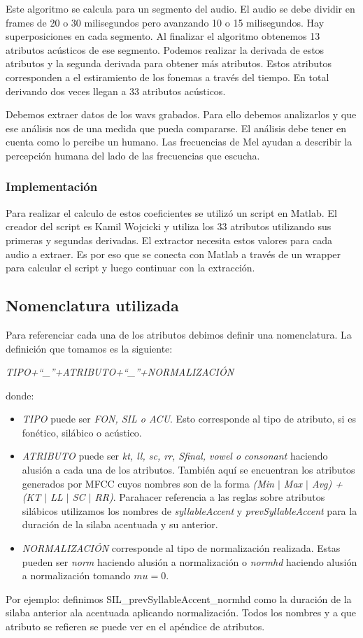 Este algoritmo se calcula para un segmento del audio. El audio se debe dividir en frames de 20 o 30 milisegundos pero avanzando 10 o 15 milisegundos. Hay superposiciones en cada segmento. Al finalizar el algoritmo obtenemos 13 atributos acústicos de ese segmento. Podemos realizar la derivada de estos atributos y la segunda derivada para obtener más atributos. Estos atributos corresponden a el estiramiento de los fonemas a través del tiempo. En total derivando dos veces llegan a 33 atributos acústicos.

Debemos extraer datos de los wavs grabados. Para ello debemos analizarlos y que ese análisis nos de una medida que pueda compararse. El análisis debe tener en cuenta como lo percibe un humano. Las frecuencias de Mel ayudan a describir la percepción humana del lado de las frecuencias que escucha. 

\subsubsection{Implementación}

Para realizar el calculo de estos coeficientes se utilizó un script en Matlab. El creador del script es Kamil Wojcicki y utiliza los 33 atributos utilizando sus primeras y segundas derivadas. El extractor necesita estos valores para cada audio a extraer. Es por eso que se conecta con Matlab a través de un wrapper para calcular el script y luego continuar con la extracción.

\subsection{Nomenclatura utilizada}
Para referenciar cada una de los atributos debimos definir una nomenclatura. La definición que tomamos es la siguiente:
\begin{center}
\textit{TIPO+``\_''+ATRIBUTO+``\_''+NORMALIZACIÓN} 
\end{center}
donde:
\begin{itemize}
  \item \emph{TIPO} puede ser \emph{FON, SIL o ACU}. Esto corresponde al tipo de atributo, si es fonético, silábico o acústico.
  \item \emph{ATRIBUTO} puede ser \emph{kt, ll, sc, rr, Sfinal, vowel o consonant} haciendo alusión a cada una de los atributos. También aquí se encuentran los atributos generados por MFCC cuyos nombres son de la forma \emph{(Min $|$ Max $|$ Avg) + (KT $|$ LL $|$ SC $|$ RR)}. Parahacer referencia a las reglas sobre atributos silábicos utilizamos los nombres de \emph{syllableAccent} y \emph{prevSyllableAccent} para la duración de la silaba acentuada y su anterior.
  \item \emph{NORMALIZACIÓN} corresponde al tipo de normalización realizada. Estas pueden ser \emph{norm} haciendo alusión a normalización o \emph{normhd} haciendo alusión a normalización tomando $mu=0$.
\end{itemize}
 
Por ejemplo: definimos  SIL\_prevSyllableAccent\_normhd como la duración de la silaba anterior ala acentuada aplicando normalización. Todos los nombres y a que atributo se refieren se puede ver en el apéndice de atributos.
